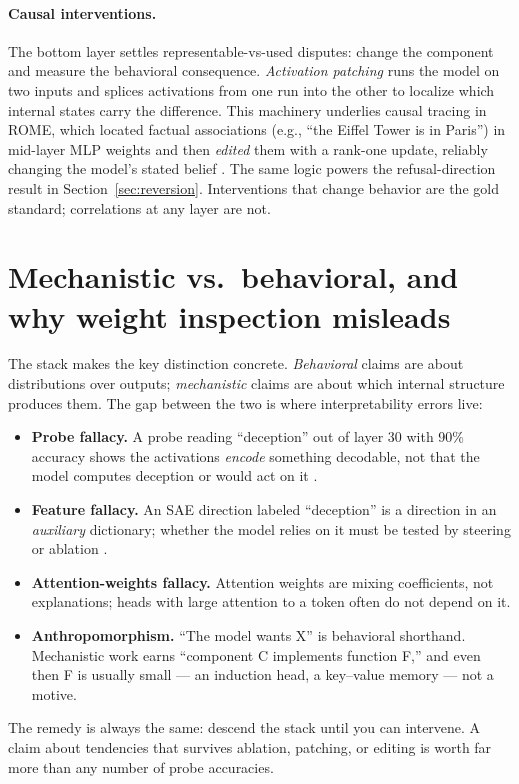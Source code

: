 \documentclass[11pt]{article}
\begin{document}
\paragraph{Causal interventions.} The bottom layer settles representable-vs-used disputes: change the component and measure the behavioral consequence. \emph{Activation patching} runs the model on two inputs and splices activations from one run into the other to localize which internal states carry the difference. This machinery underlies causal tracing in ROME, which located factual associations (e.g., ``the Eiffel Tower is in Paris'') in mid-layer MLP weights and then \emph{edited} them with a rank-one update, reliably changing the model's stated belief \cite{meng2022locating}. The same logic powers the refusal-direction result in Section~\ref{sec:reversion}. Interventions that change behavior are the gold standard; correlations at any layer are not.

\section{Mechanistic vs.\ behavioral, and why weight inspection misleads}
The stack makes the key distinction concrete. \emph{Behavioral} claims are about distributions over outputs; \emph{mechanistic} claims are about which internal structure produces them. The gap between the two is where interpretability errors live:
\begin{itemize}[noitemsep]
  \item \textbf{Probe fallacy.} A probe reading ``deception'' out of layer 30 with 90\% accuracy shows the activations \emph{encode} something decodable, not that the model computes deception or would act on it \cite{belinkov2022probing}.
  \item \textbf{Feature fallacy.} An SAE direction labeled ``deception'' is a direction in an \emph{auxiliary} dictionary; whether the model relies on it must be tested by steering or ablation \cite{bricken2023monosemanticity,templeton2024scaling}.
  \item \textbf{Attention-weights fallacy.} Attention weights are mixing coefficients, not explanations; heads with large attention to a token often do not depend on it.
  \item \textbf{Anthropomorphism.} ``The model wants X'' is behavioral shorthand. Mechanistic work earns ``component C implements function F,'' and even then F is usually small --- an induction head, a key--value memory --- not a motive.
\end{itemize}
The remedy is always the same: descend the stack until you can intervene. A claim about tendencies that survives ablation, patching, or editing is worth far more than any number of probe accuracies.
\end{document}
